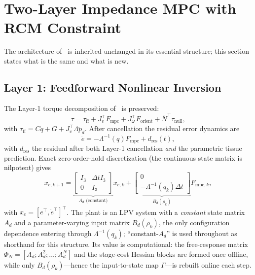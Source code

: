 \section{Two-Layer Impedance MPC with RCM Constraint}\label{sec:mpc}

The architecture of~\cite{cao2026phri} is inherited unchanged in its essential structure; this section states what is the same and what is new.

\subsection{Layer 1: Feedforward Nonlinear Inversion}

The Layer-1 torque decomposition of~\cite{cao2026phri} is preserved:
\begin{equation}
\tau = \tau_{\text{ff}} + J_v^\top F_{\text{mpc}} + J_\omega^\top F_{\text{orient}} + \bar{N}^\top \tau_{\text{null}},
\label{eq:torque}
\end{equation}
with $\tau_{\text{ff}} = C\dot{q} + G + J_v^\top \Lambda \ddot{p}_d$. After cancellation the residual error dynamics are
\begin{equation}
\ddot{e} = -\Lambda^{-1}(q) F_{\text{mpc}} + d_{\text{res}}(t),
\label{eq:errdyn}
\end{equation}
with $d_{\text{res}}$ the residual after both Layer-1 cancellation \emph{and} the parametric tissue prediction. Exact zero-order-hold discretization (the continuous state matrix is nilpotent) gives
\begin{equation}
x_{e,k+1} = \underbrace{\begin{bmatrix} I_3 & \Delta t I_3 \\ 0 & I_3 \end{bmatrix}}_{A_d \text{ (constant)}} x_{e,k} + \underbrace{\begin{bmatrix} 0 \\ -\Lambda^{-1}(q_k) \Delta t \end{bmatrix}}_{B_d(\rho_k)} F_{\text{mpc},k},
\label{eq:discrete}
\end{equation}
with $x_e = [e^\top, \dot{e}^\top]^\top$. The plant is an LPV system with a \emph{constant} state matrix $A_d$ and a parameter-varying input matrix $B_d(\rho_k)$, the only configuration dependence entering through $\Lambda^{-1}(q_k)$; ``constant-$A_d$'' is used throughout as shorthand for this structure. Its value is computational: the free-response matrix $\Phi_N=[A_d;A_d^2;\dots;A_d^N]$ and the stage-cost Hessian blocks are formed once offline, while only $B_d(\rho_k)$---hence the input-to-state map $\Gamma$---is rebuilt online each step.


